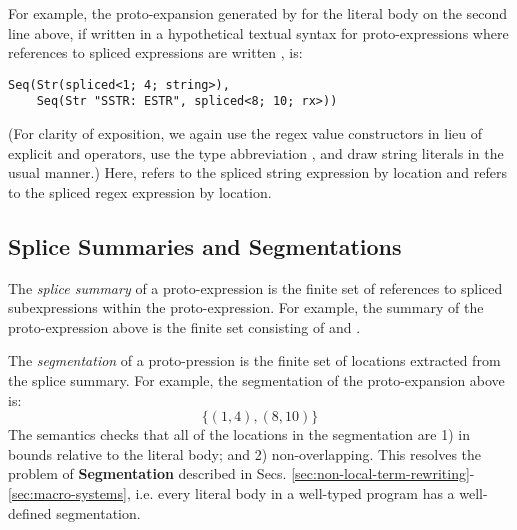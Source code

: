 For example, the proto-expansion generated by  for the literal body on the second line above, if written in a hypothetical textual syntax for proto-expressions where references to spliced expressions are written , is:
\begin{lstlisting}[numbers=none]
Seq(Str(spliced<1; 4; string>), 
    Seq(Str "SSTR: ESTR", spliced<8; 10; rx>))
\end{lstlisting}
(For clarity of exposition, we again use the regex value constructors in lieu of explicit  and  operators, use the type abbreviation , and draw string literals in the usual manner.) Here,  refers to the spliced string expression  by location and  refers to the spliced regex expression  by location. 




\subsection{Splice Summaries and Segmentations}
The \emph{splice summary} of a proto-expression is the finite set of references to spliced subexpressions within the proto-expression. For example, the summary of the proto-expression above is the finite set consisting of  and .

The \emph{segmentation} of a proto-pression is the finite set of locations extracted from the splice summary. For example, the segmentation of the proto-expansion above is:
\[\{(1, 4), (8, 10)\}\]
The semantics checks that all of the locations in the segmentation are 1) in bounds relative to the literal body; and 2) non-overlapping. 
This resolves the problem of \textbf{Segmentation} described in Secs. \ref{sec:non-local-term-rewriting}-\ref{sec:macro-systems}, i.e. every literal body in a well-typed program has a well-defined segmentation. 


